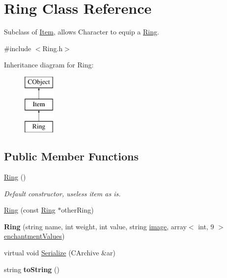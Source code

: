 \hypertarget{class_ring}{}\section{Ring Class Reference}
\label{class_ring}


Subclass of \hyperlink{class_item}{Item}, allows Character to equip a \hyperlink{class_ring}{Ring}.  




{\ttfamily \#include $<$Ring.\+h$>$}

Inheritance diagram for Ring\+:\begin{figure}[H]
\begin{center}
\leavevmode
\includegraphics[height=3.000000cm]{class_ring}
\end{center}
\end{figure}
\subsection*{Public Member Functions}
\begin{DoxyCompactItemize}
\item 
\hypertarget{class_ring_afc47f40ab072db783126111b70693e49}{}\label{class_ring_afc47f40ab072db783126111b70693e49} 
\hyperlink{class_ring_afc47f40ab072db783126111b70693e49}{Ring} ()
\begin{DoxyCompactList}\small\item\em Default constructor, useless item as is. \end{DoxyCompactList}\item 
\hyperlink{class_ring_ab65389fd4a0837c0f82a1b9207ba8330}{Ring} (const \hyperlink{class_ring}{Ring} $\ast$other\+Ring)
\item 
\hypertarget{class_ring_a0baf0ece716fa58742a031579310834b}{}\label{class_ring_a0baf0ece716fa58742a031579310834b} 
{\bfseries Ring} (string name, int weight, int value, string \hyperlink{class_item_add84a42b692ee5d580a92ae4a922f784}{image}, array$<$ int, 9 $>$ \hyperlink{class_item_a8532d8729f9433f41b7fc18b20d83236}{enchantment\+Values})
\item 
virtual void \hyperlink{class_ring_a123e40607e2aa46b27da2228af73eb4a}{Serialize} (C\+Archive \&ar)
\item 
\hypertarget{class_ring_a26ce5c958d1e1e150f232317a99069a1}{}\label{class_ring_a26ce5c958d1e1e150f232317a99069a1} 
string {\bfseries to\+String} ()
\end{DoxyCompactItemize}
